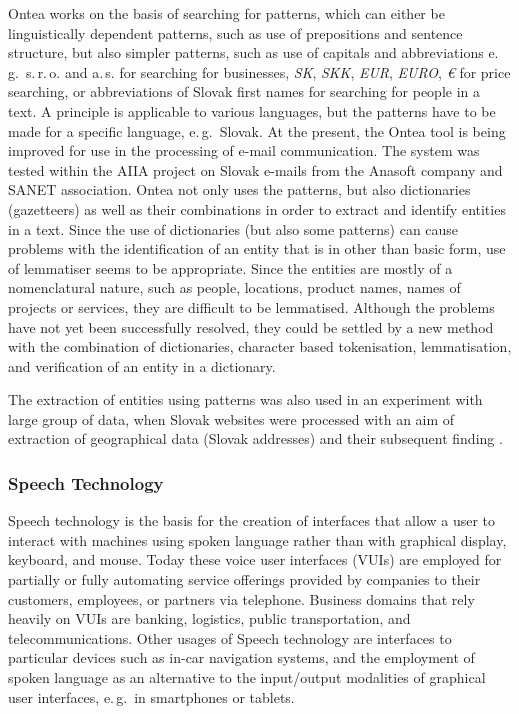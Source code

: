 \begin{multicols}{2}
Ontea works on the basis of searching for patterns, which can either be linguistically dependent patterns, such as use of prepositions and sentence structure, but also simpler patterns, such as use of capitals and abbreviations e.\,g.~s.\,r.\,o. and a.\,s. for searching for businesses, \emph{SK}, \emph{SKK}, \emph{EUR}, \emph{EURO}, \emph{€} for price searching, or abbreviations of Slovak first names for searching for people in a text. A principle is applicable to various languages, but the patterns have to be made for a specific language, e.\,g.~Slovak.  At the present, the Ontea tool is being improved for use in the processing of e-mail communication. The system was tested within the AIIA project\cite{f29} \cite{laclavik2010} on Slovak e-mails from the Anasoft company and SANET association. Ontea not only uses the patterns, but also dictionaries (gazetteers) as well as their combinations in order to extract and identify entities in a text. Since the use of dictionaries (but also some patterns) can cause problems with the identification of an entity that is in other than basic form, use of lemmatiser seems to be appropriate. Since the entities are mostly of a nomenclatural nature, such as people, locations, product names, names of projects or services, they are difficult to be lemmatised. Although the problems have not yet been successfully resolved, they could be settled by a new method with the combination of dictionaries, character based tokenisation, lemmatisation, and verification of an entity in a dictionary.

The extraction of entities using patterns was also used in an experiment with large group of data, when Slovak websites were processed with an aim of extraction of geographical data (Slovak addresses) and their subsequent finding  \cite{dlugolinsky2010}.

\subsubsection{Speech Technology}
Speech technology is the basis for the creation of interfaces that allow a user to interact with machines using spoken language rather than with graphical display, keyboard, and mouse. Today these voice user interfaces (VUIs) are employed for partially or fully automating service offerings provided by companies to their customers, employees, or partners via telephone. Business domains that rely heavily on VUIs are banking, logistics, public transportation, and telecommunications. Other usages of Speech technology are interfaces to particular devices such as in-car navigation systems, and the employment of spoken language as an alternative to the input/output modalities of graphical user interfaces, e.\,g.~in smartphones or tablets.


\end{multicols}
